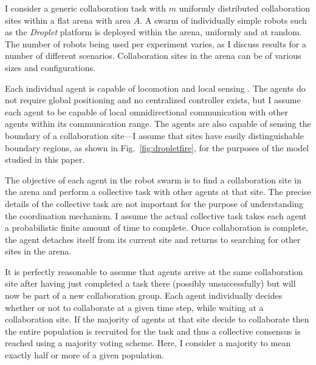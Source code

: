 \documentclass[defaultstyle,12pt]{proposal}
\begin{document}
I consider a generic collaboration task with $m$ uniformly distributed collaboration sites within a flat arena with area $A$. A swarm of individually simple robots such as the \emph{Droplet} platform \cite{Farrow2014,Klingner2014} is deployed within the arena, uniformly and at random. The number of robots being used per experiment varies, as I discuss results for a number of different scenarios. Collaboration sites in the arena can be of various sizes and configurations.

Each individual agent is capable of locomotion \cite{Klingner2014} and local sensing \cite{Farrow2014}. The agents do not require global positioning and no centralized controller exists, but I assume each agent to be capable of local omnidirectional communication with other agents within its communication range. The agents are also capable of sensing the boundary of a collaboration site---I assume that sites have easily distinguishable boundary regions, as shown in Fig.~\ref{fig:dropletfire}, for the purposes of the model studied in this paper. 

The objective of each agent in the robot swarm is to find a collaboration site in the arena and perform a collective task with other agents at that site. The precise details of the collective task are not important for the purpose of understanding the coordination mechanism. I assume the actual collective task takes each agent a probabilistic finite amount of time to complete. Once collaboration is complete, the agent detaches itself from its current site and returns to searching for other sites in the arena. 

It is perfectly reasonable to assume that agents arrive at the same collaboration site after having just completed a task there (possibly unsuccessfully) but will now be part of a new collaboration group. Each agent individually decides whether or not to collaborate at a given time step, while waiting at a collaboration site. If the majority of agents at that site decide to collaborate then the entire population is recruited for the task and thus a collective consensus is reached using a majority voting scheme. Here, I consider a majority to mean exactly half or more of a given population. 
\end{document}
